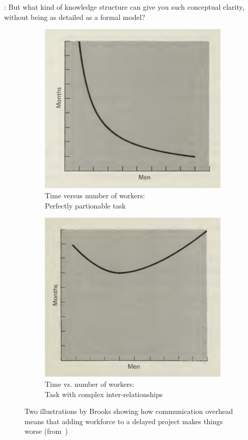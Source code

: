 \documentclass[runningheads]{llncs}
\newcommand{\T}{Tomas}
\newcommand{\says}[2][gg]{\vspace{0.5em}\noindent\hangindent=0.5cm{\textsc{#1}}: #2}
\begin{document}
\says[\T]{But what kind of knowledge structure can give you such conceptual clarity, without being as detailed as a formal model?}

\begin{figure}[t]
\centering
\begin{subfigure}{0.49\textwidth}
   \noindent
   \includegraphics[scale=0.3]{figures/mm1.png}
   \caption{Time versus number of workers:\\Perfectly partionable task}
   \label{fig:xx}
\end{subfigure}
\hfill
\begin{subfigure}{0.49\textwidth}
   \noindent
   \includegraphics[scale=0.3]{figures/mm2.png}
   \caption{Time vs. number of workers:\\Task with complex inter-relationships}
   \label{fig:syy}
\end{subfigure}
\caption{Two illustrations by Brooks showing how communication overhead means that adding workforce to a delayed project makes things worse (from~\cite{brooks-1975-manmonth})}
\label{fig:mm}
\end{figure}
\end{document}

